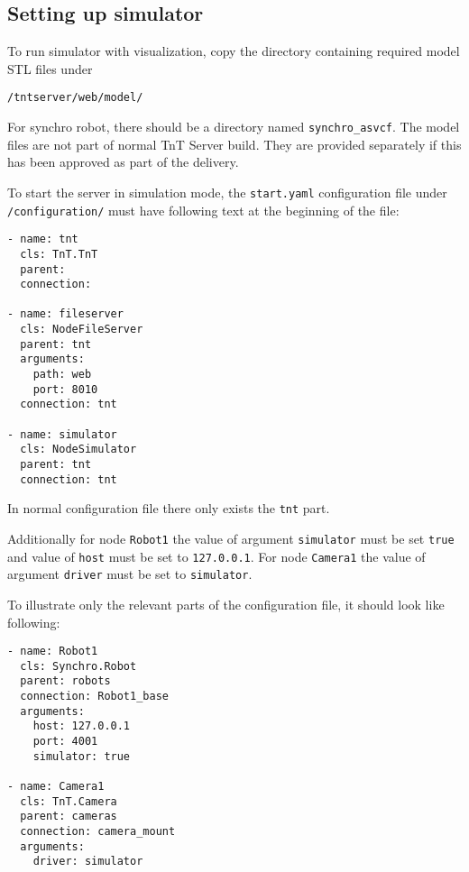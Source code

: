 
\subsection{Setting up simulator}

To run simulator with visualization, copy the directory containing required model STL files under

\texttt{\tntServerFolder/tntserver/web/model/}

For synchro robot, there should be a directory named \texttt{synchro\_asvcf}. The model files are not part of normal TnT Server build. They are provided separately if this has been approved as part of the delivery.

To start the server in simulation mode, the \texttt{start.yaml} configuration file under \texttt{\tntServerFolder/configuration/} must have following text at the beginning of the file:

\begin{lstlisting}
- name: tnt
  cls: TnT.TnT
  parent:
  connection:
  
- name: fileserver
  cls: NodeFileServer
  parent: tnt
  arguments:
    path: web
    port: 8010
  connection: tnt

- name: simulator
  cls: NodeSimulator
  parent: tnt
  connection: tnt
\end{lstlisting}

In normal configuration file there only exists the \texttt{tnt} part.

Additionally for node \texttt{Robot1} the value of argument \texttt{simulator} must be set \texttt{true} and value of \texttt{host} must be set to \texttt{127.0.0.1}. For node \texttt{Camera1} the value of argument \texttt{driver} must be set to \texttt{simulator}.

To illustrate only the relevant parts of the configuration file, it should look like following:

\begin{lstlisting}
- name: Robot1
  cls: Synchro.Robot
  parent: robots
  connection: Robot1_base
  arguments:
    host: 127.0.0.1
    port: 4001
    simulator: true
    
- name: Camera1
  cls: TnT.Camera
  parent: cameras
  connection: camera_mount
  arguments:
    driver: simulator
\end{lstlisting}

